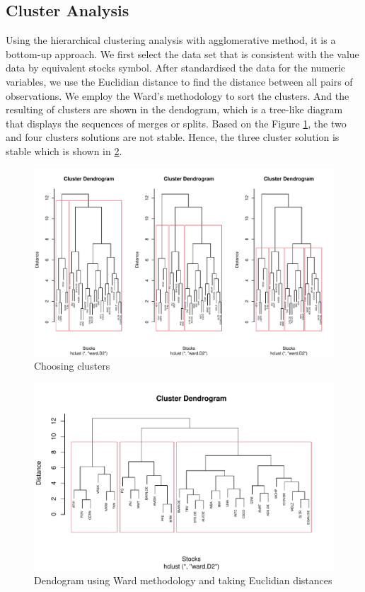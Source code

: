 \documentclass[11pt,a4paper,]{article}
\begin{document}
\hypertarget{cluster-analysis}{%
\subsection{Cluster Analysis}\label{cluster-analysis}}

Using the hierarchical clustering analysis with agglomerative method, it is a bottom-up approach. We first select the data set that is consistent with the value data by equivalent stocks symbol. After standardised the data for the numeric variables, we use the Euclidian distance to find the distance between all pairs of observations. We employ the Ward's methodology to sort the clusters. And the resulting of clusters are shown in the dendogram, which is a tree-like diagram that displays the sequences of merges or splits. Based on the Figure \ref{fig:ward}, the two and four clusters solutions are not stable. Hence, the three cluster solution is stable which is shown in \ref{fig:ward-3}.

\begin{figure}
\centering
\includegraphics{ass2_files/figure-latex/ward-1.pdf}
\caption{\label{fig:ward}Choosing clusters}
\end{figure}

\begin{figure}
\centering
\includegraphics{ass2_files/figure-latex/ward-3-1.pdf}
\caption{\label{fig:ward-3}Dendogram using Ward methodology and taking Euclidian distances}
\end{figure}
\end{document}
